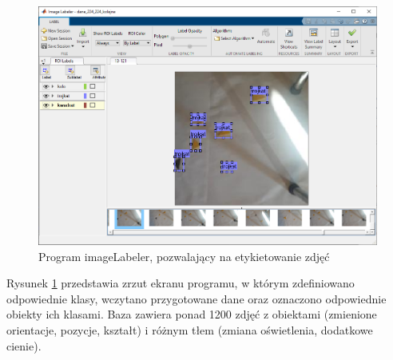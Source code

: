 \begin{figure}[H]
	\centering
	\includegraphics[width=12cm]{pages/uczenie/img/imageLabeler.png}
	\caption{Program imageLabeler, pozwalający na etykietowanie zdjęć}
	\label{fig:imgageLabelerMatlab}
\end{figure}
Rysunek \ref{fig:imgageLabelerMatlab} przedstawia zrzut ekranu programu, w którym zdefiniowano odpowiednie klasy, wczytano 
przygotowane dane oraz oznaczono odpowiednie obiekty ich klasami.
Baza zawiera ponad 1200 zdjęć z obiektami (zmienione orientacje, pozycje, kształt) i różnym tłem (zmiana oświetlenia, dodatkowe cienie).

